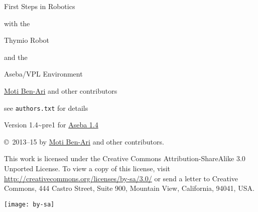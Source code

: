 \thispagestyle{empty}

\begin{center}
\begin{Huge}
\begin{bfseries}
First Steps in Robotics
\end{bfseries}

with the

\begin{bfseries}
Thymio Robot
\end{bfseries}

and the

\begin{bfseries}
Aseba/VPL Environment
\end{bfseries}

\end{Huge}

\vskip 2cm

\begin{LARGE}
\href{http://www.weizmann.ac.il/sci-tea/benari/}{Moti Ben-Ari} and other contributors\\
\end{LARGE}
\bigskip
\begin{Large}
see \texttt{authors.txt} for details
\end{Large}

\vskip 1cm

\begin{Large}
Version 1.4{\textasciitilde}pre1 for \href{https://aseba.wikidot.com/en:downloadinstall}{Aseba 1.4}
\end{Large}

\end{center}

\vfill

\begin{center}
\copyright{}\  2013--15 by \href{http://www.weizmann.ac.il/sci-tea/benari/}{Moti Ben-Ari} and other contributors.
\end{center}

This work is licensed under the Creative Commons
Attribution-ShareAlike 3.0 Unported License. To view a copy
of this license, visit
\href{http://creativecommons.org/licenses/by-sa/3.0/}{http://creativecommons.org/licenses/by-sa/3.0/}
or send a letter to Creative Commons, 444 Castro Street, Suite 900,
Mountain View, California, 94041, USA.

\begin{center}
\texttt{[image: by-sa]}
\end{center}

\newpage
\begin{spacing}{0.7}
\tableofcontents
\end{spacing}
\thispagestyle{empty}
\newpage
\setcounter{page}{1}
